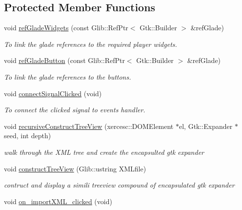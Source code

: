 \subsection*{Protected Member Functions}
\begin{DoxyCompactItemize}
\item 
void \hyperlink{classmetadataWindow_a55000d98104194ea2f70e7cc1fbb2848}{ref\-Glade\-Widgets} (const Glib\-::\-Ref\-Ptr$<$ Gtk\-::\-Builder $>$ \&ref\-Glade)
\begin{DoxyCompactList}\small\item\em To link the glade references to the required player widgets. \end{DoxyCompactList}\item 
void \hyperlink{classmetadataWindow_a10eadf8977d80290cf4645c3c952526f}{ref\-Glade\-Button} (const Glib\-::\-Ref\-Ptr$<$ Gtk\-::\-Builder $>$ \&ref\-Glade)
\begin{DoxyCompactList}\small\item\em To link the glade references to the buttons. \end{DoxyCompactList}\item 
void \hyperlink{classmetadataWindow_ae95e4099d104c57d154296b93337ebf8}{connect\-Signal\-Clicked} (void)
\begin{DoxyCompactList}\small\item\em To connect the clicked signal to events handler. \end{DoxyCompactList}\item 
void \hyperlink{classmetadataWindow_a04c912f00d93f013a4c669ad9413e0a6}{recursive\-Construct\-Tree\-View} (xercesc\-::\-D\-O\-M\-Element $\ast$el, Gtk\-::\-Expander $\ast$seed, int depth)
\begin{DoxyCompactList}\small\item\em walk through the X\-M\-L tree and create the encapsulted gtk expander \end{DoxyCompactList}\item 
void \hyperlink{classmetadataWindow_a9613f659ea4b4ab84c57ea14c09e94ec}{construct\-Tree\-View} (Glib\-::ustring X\-M\-Lfile)
\begin{DoxyCompactList}\small\item\em contruct and display a simili treeview compound of encapsulated gtk expander \end{DoxyCompactList}\item 
void \hyperlink{classmetadataWindow_af97403dfa24c67b570e1c95e59d3aedb}{on\-\_\-import\-X\-M\-L\-\_\-clicked} (void)
\item 

\end{DoxyCompactItemize}
